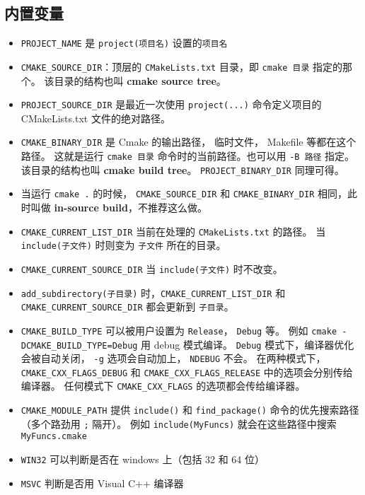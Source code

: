 \subsection{内置变量}
\begin{itemize}
\item \verb`PROJECT_NAME` 是 \verb`project(项目名)` 设置的\verb`项目名`
\item \verb`CMAKE_SOURCE_DIR`：顶层的 \verb`CMakeLists.txt` 目录，即 \verb`cmake 目录` 指定的那个。 该目录的结构也叫 \textbf{cmake source tree}。
\item \verb`PROJECT_SOURCE_DIR` 是最近一次使用 \verb`project(...)` 命令定义项目的 CMakeLists.txt 文件的绝对路径。
\item \verb`CMAKE_BINARY_DIR` 是 Cmake 的输出路径， 临时文件， Makefile 等都在这个路径。 这就是运行 \verb`cmake 目录` 命令时的当前路径。也可以用 \verb`-B 路径` 指定。 该目录的结构也叫 \textbf{cmake build tree}。 \verb`PROJECT_BINARY_DIR` 同理可得。
\item 当运行 \verb`cmake .` 的时候， \verb`CMAKE_SOURCE_DIR` 和 \verb`CMAKE_BINARY_DIR` 相同，此时叫做 \textbf{in-source build}，不推荐这么做。
\item \verb`CMAKE_CURRENT_LIST_DIR` 当前在处理的 \verb`CMakeLists.txt` 的路径。 当 \verb`include(子文件)` 时则变为 \verb`子文件` 所在的目录。
\item \verb`CMAKE_CURRENT_SOURCE_DIR` 当 \verb`include(子文件)` 时不改变。
\item \verb`add_subdirectory(子目录)` 时，\verb`CMAKE_CURRENT_LIST_DIR` 和 \verb`CMAKE_CURRENT_SOURCE_DIR` 都会更新到 \verb`子目录`。
\item \verb`CMAKE_BUILD_TYPE` 可以被用户设置为 \verb`Release`， \verb`Debug` 等。 例如 \verb`cmake -DCMAKE_BUILD_TYPE=Debug` 用 debug 模式编译。 \verb`Debug` 模式下，编译器优化会被自动关闭， \verb`-g` 选项会自动加上， \verb`NDEBUG` 不会。 在两种模式下， \verb`CMAKE_CXX_FLAGS_DEBUG` 和 \verb`CMAKE_CXX_FLAGS_RELEASE` 中的选项会分别传给编译器。 任何模式下 \verb`CMAKE_CXX_FLAGS` 的选项都会传给编译器。
\item \verb`CMAKE_MODULE_PATH` 提供 \verb`include()` 和 \verb`find_package()` 命令的优先搜索路径（多个路劲用 \verb`;` 隔开）。 例如 \verb`include(MyFuncs)` 就会在这些路径中搜索 \verb`MyFuncs.cmake`
\item \verb`WIN32` 可以判断是否在 windows 上（包括 32 和 64 位）
\item \verb`MSVC` 判断是否用 Visual C++ 编译器
\end{itemize}

